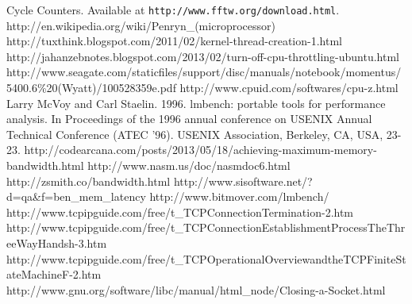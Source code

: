 \documentclass{article} %
\begin{document}
\newpage
\clearpage
\begin{thebibliography}{1}

   Cycle Counters. Available at {\tt http://www.fftw.org/download.html}.
  \bibitem{}http://en.wikipedia.org/wiki/Penryn\_(microprocessor)
  \bibitem{}http://tuxthink.blogspot.com/2011/02/kernel-thread-creation-1.html
  \bibitem{}http://jahanzebnotes.blogspot.com/2013/02/turn-off-cpu-throttling-ubuntu.html
  \bibitem{}http://www.seagate.com/staticfiles/support/disc/manuals/notebook/momentus/5400.6\%20(Wyatt)/100528359e.pdf
  \bibitem{}http://www.cpuid.com/softwares/cpu-z.html
  \bibitem{}Larry McVoy and Carl Staelin. 1996. lmbench: portable tools for performance analysis. In Proceedings of the 1996 annual conference on USENIX Annual Technical Conference (ATEC '96). USENIX Association, Berkeley, CA, USA, 23-23.
  \bibitem{}http://codearcana.com/posts/2013/05/18/achieving-maximum-memory-bandwidth.html
  \bibitem{}http://www.nasm.us/doc/nasmdoc6.html
  \bibitem{}http://zsmith.co/bandwidth.html
  \bibitem{}http://www.sisoftware.net/?d=qa\&f=ben\_mem\_latency
  \bibitem{}http://www.bitmover.com/lmbench/
  \bibitem{}http://www.tcpipguide.com/free/t\_TCPConnectionTermination-2.htm
  \bibitem{}http://www.tcpipguide.com/free/t\_TCPConnectionEstablishmentProcessTheThreeWayHandsh-3.htm
  \bibitem{}http://www.tcpipguide.com/free/t\_TCPOperationalOverviewandtheTCPFiniteStateMachineF-2.htm
  http://www.gnu.org/software/libc/manual/html\_node/Closing-a-Socket.html

\end{thebibliography}
\end{document}
